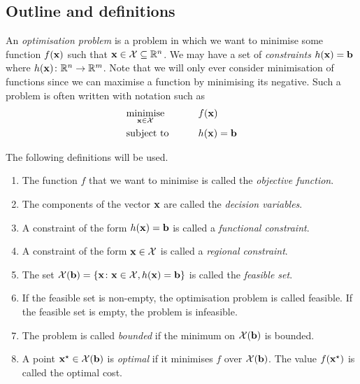 \subsection{Outline and definitions}
An \textit{optimisation problem} is a problem in which we want to minimise some function \(f(\vb x)\) such that \(\vb x \in \mathcal X \subseteq \mathbb R^n\).
We may have a set of \textit{constraints} \(h(\vb x) = \vb b\) where \(h(\vb x) \colon \mathbb R^n \to \mathbb R^m\).
Note that we will only ever consider minimisation of functions since we can maximise a function by minimising its negative.
Such a problem is often written with notation such as
\begin{alignat*}{2}
	 & \underset{\vb x \in \mathcal X}{\text{minimise}} & \qquad & f(\vb x)         \\
	 & \text{subject to}                                &        & h(\vb x) = \vb b
\end{alignat*}

\begin{definition}
	The following definitions will be used.
	\begin{enumerate}
		\item The function \(f\) that we want to minimise is called the \textit{objective function}.
		\item The components of the vector \(\vb x\) are called the \textit{decision variables}.
		\item A constraint of the form \(h(\vb x) = \vb b\) is called a \textit{functional constraint}.
		\item A constraint of the form \(\vb x \in \mathcal X\) is called a \textit{regional constraint}.
		\item The set \( \mathcal X(\vb b) = \qty{\vb x \colon \vb x \in \mathcal X, h(\vb x) = \vb b} \) is called the \textit{feasible set}.
		\item If the feasible set is non-empty, the optimisation problem is called feasible.
		      If the feasible set is empty, the problem is infeasible.
		\item The problem is called \textit{bounded} if the minimum on \(\mathcal X(\vb b)\) is bounded.
		\item A point \(\vb x^\star \in \mathcal X(\vb b)\) is \textit{optimal} if it minimises \(f\) over \(\mathcal X(\vb b)\).
		      The value \(f(\vb x^\star)\) is called the optimal cost.
	\end{enumerate}
\end{definition}

